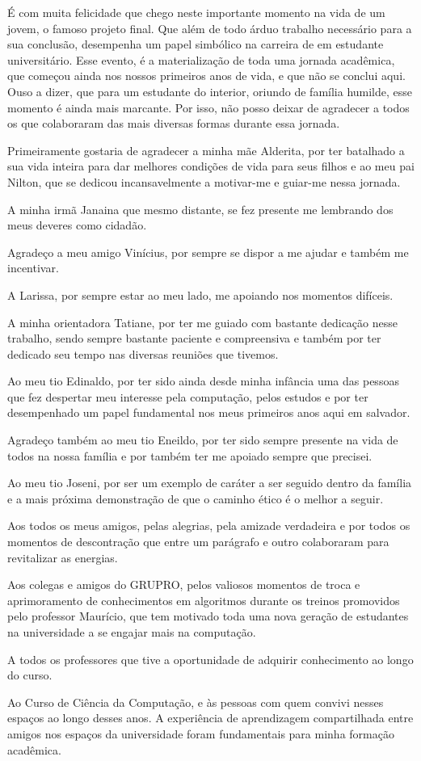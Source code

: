 É com muita felicidade que chego neste importante momento na vida de um jovem, o famoso projeto
final. Que além de todo árduo trabalho necessário para a sua conclusão, desempenha um papel
simbólico na carreira de em estudante universitário. Esse evento, é a materialização de toda uma
jornada acadêmica, que começou ainda nos nossos primeiros anos de vida, e que não se conclui aqui.
Ouso a dizer, que para um estudante do interior, oriundo de família humilde, esse momento é ainda
mais marcante. Por isso, não posso deixar
de agradecer a todos os que colaboraram das mais diversas formas durante essa jornada.

Primeiramente gostaria de agradecer a minha mãe Alderita, por ter batalhado a sua vida inteira para
dar melhores condições de vida para seus filhos e ao meu pai Nilton, que se dedicou incansavelmente a
motivar-me e guiar-me nessa jornada. 

A minha irmã Janaina que mesmo distante, se fez presente me lembrando
dos meus deveres como cidadão.

Agradeço a meu amigo Vinícius, por sempre se dispor a me ajudar e também me incentivar. 

A Larissa, por sempre estar ao meu lado, me apoiando nos momentos difíceis. 

A minha orientadora Tatiane, por ter me guiado com bastante dedicação nesse trabalho, sendo sempre
bastante paciente e compreensiva e também por ter dedicado seu tempo nas diversas reuniões que
tivemos.

Ao meu tio Edinaldo, por ter sido ainda desde minha infância uma das pessoas que fez despertar meu
interesse pela computação, pelos estudos e por ter desempenhado um papel fundamental nos meus
primeiros anos aqui em salvador.

Agradeço também ao meu tio Eneildo, por ter sido sempre presente na vida de todos na nossa família e
por também ter me apoiado sempre que precisei.

Ao meu tio Joseni, por ser um exemplo de caráter a ser seguido dentro da família e a mais próxima
demonstração de que o caminho ético é o melhor a seguir. 

Aos todos os meus amigos, pelas alegrias, pela amizade verdadeira e por todos os momentos de
descontração que entre um parágrafo e outro colaboraram para revitalizar as energias.

Aos colegas e amigos do GRUPRO, pelos valiosos momentos de troca e aprimoramento de conhecimentos em
algoritmos durante os treinos promovidos pelo professor Maurício, que tem motivado toda uma nova
geração de estudantes na universidade a se engajar mais na computação.

A todos os professores que tive a oportunidade de adquirir conhecimento ao longo do curso.

Ao Curso de Ciência da Computação, e às pessoas com quem convivi nesses espaços ao longo desses
anos. A experiência de aprendizagem compartilhada entre amigos nos espaços da universidade foram
fundamentais para minha formação acadêmica.
